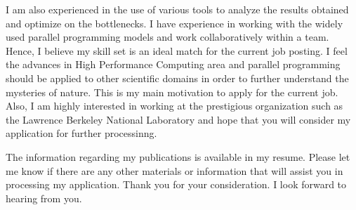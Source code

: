 \documentclass[10pt,stdletter,dateno]{newlfm}
\begin{document}
\begin{newlfm}
	   I am also experienced in the use of various tools to analyze the results obtained and optimize on the bottlenecks.
	   I have experience in working with the widely used parallel programming models and work collaboratively within a team.
	   Hence, I believe my skill set is an ideal match for the current job posting. 
	   I feel the advances in High Performance Computing area and parallel programming should be applied to other scientific domains in order to further understand the mysteries of nature.
	   This is my main motivation to apply for the current job. 
	   Also, I am highly interested in working at the prestigious organization such as the Lawrence Berkeley National Laboratory and hope that you will consider my application for further processinng. 
%
	   \par
	   The information regarding my publications is available in my resume.
	   Please let me know if there are any other materials or information that will assist you in processing my application.
	   Thank you for your consideration. I look forward to hearing from you.
%
\end{newlfm}
\end{document}
